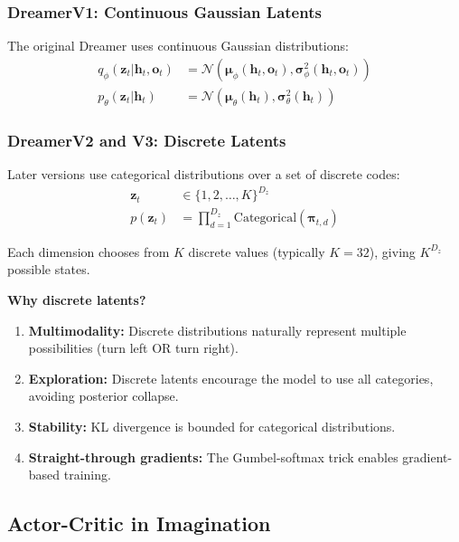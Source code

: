 \subsubsection{DreamerV1: Continuous Gaussian Latents}

The original Dreamer uses continuous Gaussian distributions:
\begin{align}
q_\phi(\mathbf{z}_t | \mathbf{h}_t, \mathbf{o}_t) &= \mathcal{N}(\boldsymbol{\mu}_\phi(\mathbf{h}_t, \mathbf{o}_t), \boldsymbol{\sigma}_\phi^2(\mathbf{h}_t, \mathbf{o}_t)) \\
p_\theta(\mathbf{z}_t | \mathbf{h}_t) &= \mathcal{N}(\boldsymbol{\mu}_\theta(\mathbf{h}_t), \boldsymbol{\sigma}_\theta^2(\mathbf{h}_t))
\end{align}

\subsubsection{DreamerV2 and V3: Discrete Latents}

Later versions use categorical distributions over a set of discrete codes:
\begin{align}
\mathbf{z}_t &\in \{1, 2, \ldots, K\}^{D_z} \\
p(\mathbf{z}_t) &= \prod_{d=1}^{D_z} \text{Categorical}(\boldsymbol{\pi}_{t,d})
\end{align}

Each dimension chooses from $K$ discrete values (typically $K = 32$), giving $K^{D_z}$ possible states.

\textbf{Why discrete latents?}

\begin{enumerate}
    \item \textbf{Multimodality:} Discrete distributions naturally represent multiple possibilities (turn left OR turn right).

    \item \textbf{Exploration:} Discrete latents encourage the model to use all categories, avoiding posterior collapse.

    \item \textbf{Stability:} KL divergence is bounded for categorical distributions.

    \item \textbf{Straight-through gradients:} The Gumbel-softmax trick enables gradient-based training.
\end{enumerate}

\subsection{Actor-Critic in Imagination}

